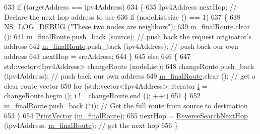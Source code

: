 \begin{DoxyCode}
633       \textcolor{keywordflow}{if} (targetAddress == ipv4Address)
634         \{
635           Ipv4Address nextHop; \textcolor{comment}{// Declare the next hop address to use}
636           \textcolor{keywordflow}{if} (nodeList.size () == 1)
637             \{
638               \hyperlink{group__logging_ga413f1886406d49f59a6a0a89b77b4d0a}{NS\_LOG\_DEBUG} (\textcolor{stringliteral}{"These two nodes are neighbors"});
639               \hyperlink{classns3_1_1dsr_1_1DsrOptions_a3fe6a72ebaae73724ce63383635b7af8}{m\_finalRoute}.clear ();
641               \hyperlink{classns3_1_1dsr_1_1DsrOptions_a3fe6a72ebaae73724ce63383635b7af8}{m\_finalRoute}.push\_back (source);     \textcolor{comment}{// push back the request originator's
       address}
642               \hyperlink{classns3_1_1dsr_1_1DsrOptions_a3fe6a72ebaae73724ce63383635b7af8}{m\_finalRoute}.push\_back (ipv4Address);    \textcolor{comment}{// push back our own address}
643               nextHop = srcAddress;
644             \}
645           \textcolor{keywordflow}{else}
646             \{
647               std::vector<Ipv4Address> changeRoute (nodeList);
648               changeRoute.push\_back (ipv4Address);    \textcolor{comment}{// push back our own address}
649               \hyperlink{classns3_1_1dsr_1_1DsrOptions_a3fe6a72ebaae73724ce63383635b7af8}{m\_finalRoute}.clear ();              \textcolor{comment}{// get a clear route vector}
650               \textcolor{keywordflow}{for} (std::vector<Ipv4Address>::iterator \hyperlink{bernuolliDistribution_8m_a6f6ccfcf58b31cb6412107d9d5281426}{i} = changeRoute.begin (); 
      \hyperlink{bernuolliDistribution_8m_a6f6ccfcf58b31cb6412107d9d5281426}{i} != changeRoute.end (); ++\hyperlink{bernuolliDistribution_8m_a6f6ccfcf58b31cb6412107d9d5281426}{i})
651                 \{
652                   \hyperlink{classns3_1_1dsr_1_1DsrOptions_a3fe6a72ebaae73724ce63383635b7af8}{m\_finalRoute}.push\_back (*\hyperlink{bernuolliDistribution_8m_a6f6ccfcf58b31cb6412107d9d5281426}{i});  \textcolor{comment}{// Get the full route from source to
       destination}
653                 \}
654               \hyperlink{classns3_1_1dsr_1_1DsrOptions_a44ae8e58769880ec9c0150bb28652350}{PrintVector} (\hyperlink{classns3_1_1dsr_1_1DsrOptions_a3fe6a72ebaae73724ce63383635b7af8}{m\_finalRoute});
655               nextHop = \hyperlink{classns3_1_1dsr_1_1DsrOptions_a9cc1c0bdf1b57f8b2eea4d9070b26a58}{ReverseSearchNextHop} (ipv4Address, 
      \hyperlink{classns3_1_1dsr_1_1DsrOptions_a3fe6a72ebaae73724ce63383635b7af8}{m\_finalRoute}); \textcolor{comment}{// get the next hop}
656             \}

\end{DoxyCode}
